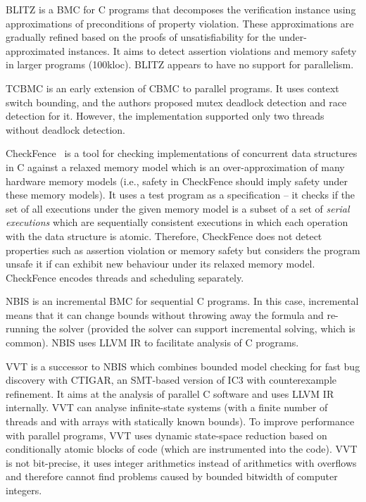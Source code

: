 BLITZ  is a BMC for C programs that decomposes the verification instance using approximations of preconditions of property violation.
These approximations are gradually refined based on the proofs of unsatisfiability for the under-approximated instances.
It aims to detect assertion violations and memory safety in larger programs (100kloc).
BLITZ appears to have no support for parallelism.

TCBMC  is an early extension of CBMC to parallel programs.
It uses context switch bounding, and the authors proposed mutex deadlock detection and race detection for it.
However, the implementation supported only two threads without deadlock detection.

CheckFence~ is a tool for checking implementations of concurrent data structures in C against a relaxed memory model which is an over-approximation of many hardware memory models (i.e., safety in CheckFence should imply safety under these memory models).
It uses a test program as a specification -- it checks if the set of all executions under the given memory model is a subset of a set of \emph{serial executions} which are sequentially consistent executions in which each operation with the data structure is atomic.
Therefore, CheckFence does not detect properties such as assertion violation or memory safety but considers the program unsafe it if can exhibit new behaviour under its relaxed memory model.
CheckFence encodes threads and scheduling separately.

NBIS  is an incremental BMC for sequential C programs.
In this case, incremental means that it can change bounds without throwing away the formula and re-running the solver (provided the solver can support incremental solving, which is common).
NBIS uses LLVM IR to facilitate analysis of C programs.

VVT  is a successor to NBIS which combines bounded model checking for fast bug discovery with CTIGAR, an SMT-based version of IC3 with counterexample refinement.
It aims at the analysis of parallel C software and uses LLVM IR internally.
VVT can analyse infinite-state systems (with a finite number of threads and with arrays with statically known bounds).
To improve performance with parallel programs, VVT uses dynamic state-space reduction based on conditionally atomic blocks of code (which are instrumented into the code).
VVT is not bit-precise, it uses integer arithmetics instead of arithmetics with overflows and therefore cannot find problems caused by bounded bitwidth of computer integers.

